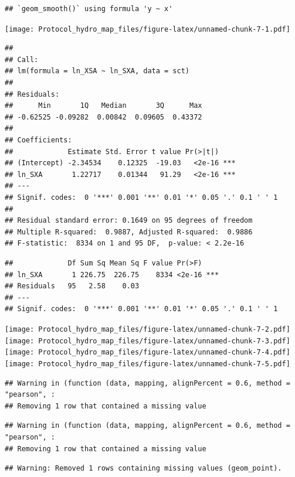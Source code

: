 \documentclass[]{article}
\begin{document}
\begin{verbatim}
## `geom_smooth()` using formula 'y ~ x'
\end{verbatim}

\texttt{[image: Protocol\_hydro\_map\_files/figure-latex/unnamed-chunk-7-1.pdf]}

\begin{verbatim}
## 
## Call:
## lm(formula = ln_XSA ~ ln_SXA, data = sct)
## 
## Residuals:
##      Min       1Q   Median       3Q      Max 
## -0.62525 -0.09282  0.00842  0.09605  0.43372 
## 
## Coefficients:
##             Estimate Std. Error t value Pr(>|t|)    
## (Intercept) -2.34534    0.12325  -19.03   <2e-16 ***
## ln_SXA       1.22717    0.01344   91.29   <2e-16 ***
## ---
## Signif. codes:  0 '***' 0.001 '**' 0.01 '*' 0.05 '.' 0.1 ' ' 1
## 
## Residual standard error: 0.1649 on 95 degrees of freedom
## Multiple R-squared:  0.9887, Adjusted R-squared:  0.9886 
## F-statistic:  8334 on 1 and 95 DF,  p-value: < 2.2e-16
\end{verbatim}

\begin{verbatim}
##             Df Sum Sq Mean Sq F value Pr(>F)    
## ln_SXA       1 226.75  226.75    8334 <2e-16 ***
## Residuals   95   2.58    0.03                   
## ---
## Signif. codes:  0 '***' 0.001 '**' 0.01 '*' 0.05 '.' 0.1 ' ' 1
\end{verbatim}

\texttt{[image: Protocol\_hydro\_map\_files/figure-latex/unnamed-chunk-7-2.pdf]}
\texttt{[image: Protocol\_hydro\_map\_files/figure-latex/unnamed-chunk-7-3.pdf]}
\texttt{[image: Protocol\_hydro\_map\_files/figure-latex/unnamed-chunk-7-4.pdf]}
\texttt{[image: Protocol\_hydro\_map\_files/figure-latex/unnamed-chunk-7-5.pdf]}

\begin{verbatim}
## Warning in (function (data, mapping, alignPercent = 0.6, method = "pearson", :
## Removing 1 row that contained a missing value
\end{verbatim}

\begin{verbatim}
## Warning in (function (data, mapping, alignPercent = 0.6, method = "pearson", :
## Removing 1 row that contained a missing value
\end{verbatim}

\begin{verbatim}
## Warning: Removed 1 rows containing missing values (geom_point).
\end{verbatim}
\end{document}
